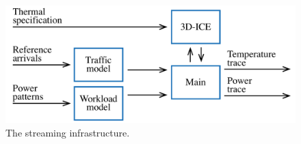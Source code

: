 \begin{figure}
  \centering
  \includegraphics[width=1.0\columnwidth]{include/assets/figures/streamer.pdf}
  \caption{The streaming infrastructure.}
\end{figure}
